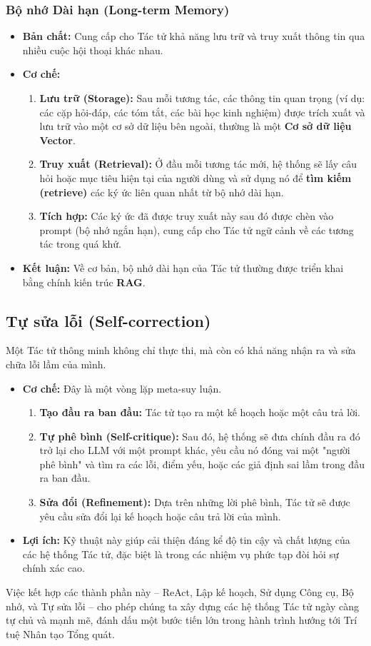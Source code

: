 \subsubsection{Bộ nhớ Dài hạn (Long-term Memory)}
\begin{itemize}
    \item \textbf{Bản chất:} Cung cấp cho Tác tử khả năng lưu trữ và truy xuất thông tin qua nhiều cuộc hội thoại khác nhau.
    \item \textbf{Cơ chế:}
        \begin{enumerate}
            \item \textbf{Lưu trữ (Storage):} Sau mỗi tương tác, các thông tin quan trọng (ví dụ: các cặp hỏi-đáp, các tóm tắt, các bài học kinh nghiệm) được trích xuất và lưu trữ vào một cơ sở dữ liệu bên ngoài, thường là một \textbf{Cơ sở dữ liệu Vector}.
            \item \textbf{Truy xuất (Retrieval):} Ở đầu mỗi tương tác mới, hệ thống sẽ lấy câu hỏi hoặc mục tiêu hiện tại của người dùng và sử dụng nó để \textbf{tìm kiếm (retrieve)} các ký ức liên quan nhất từ bộ nhớ dài hạn.
            \item \textbf{Tích hợp:} Các ký ức đã được truy xuất này sau đó được chèn vào prompt (bộ nhớ ngắn hạn), cung cấp cho Tác tử ngữ cảnh về các tương tác trong quá khứ.
        \end{enumerate}
    \item \textbf{Kết luận:} Về cơ bản, bộ nhớ dài hạn của Tác tử thường được triển khai bằng chính kiến trúc \textbf{RAG}.
\end{itemize}

\subsection{Tự sửa lỗi (Self-correction)}
\label{ssec:self_correction}
Một Tác tử thông minh không chỉ thực thi, mà còn có khả năng nhận ra và sửa chữa lỗi lầm của mình.
\begin{itemize}
    \item \textbf{Cơ chế:} Đây là một vòng lặp meta-suy luận.
        \begin{enumerate}
            \item \textbf{Tạo đầu ra ban đầu:} Tác tử tạo ra một kế hoạch hoặc một câu trả lời.
            \item \textbf{Tự phê bình (Self-critique):} Sau đó, hệ thống sẽ đưa chính đầu ra đó trở lại cho LLM với một prompt khác, yêu cầu nó đóng vai một "người phê bình" và tìm ra các lỗi, điểm yếu, hoặc các giả định sai lầm trong đầu ra ban đầu.
            \item \textbf{Sửa đổi (Refinement):} Dựa trên những lời phê bình, Tác tử sẽ được yêu cầu sửa đổi lại kế hoạch hoặc câu trả lời của mình.
        \end{enumerate}
    \item \textbf{Lợi ích:} Kỹ thuật này giúp cải thiện đáng kể độ tin cậy và chất lượng của các hệ thống Tác tử, đặc biệt là trong các nhiệm vụ phức tạp đòi hỏi sự chính xác cao.
\end{itemize}

Việc kết hợp các thành phần này -- ReAct, Lập kế hoạch, Sử dụng Công cụ, Bộ nhớ, và Tự sửa lỗi -- cho phép chúng ta xây dựng các hệ thống Tác tử ngày càng tự chủ và mạnh mẽ, đánh dấu một bước tiến lớn trong hành trình hướng tới Trí tuệ Nhân tạo Tổng quát.